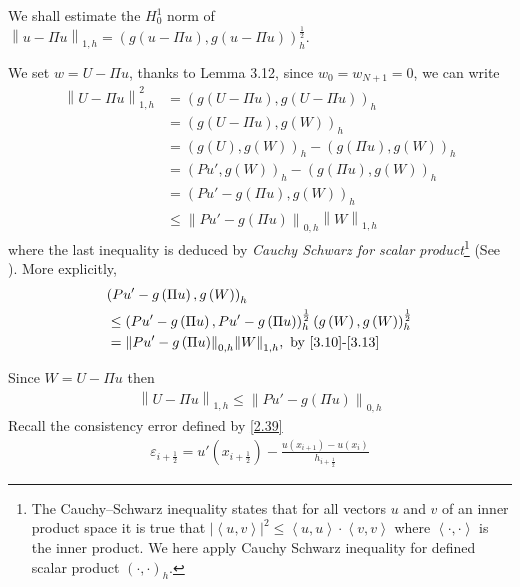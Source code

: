 \documentclass[a4paper]{article}
\numberwithin{equation}{section}
\begin{document}
We shall estimate the $H_0^1$ norm of ${\left\| {u - \Pi u} \right\|_{1,h}} = \left( {g\left( {u - \Pi u} \right),g\left( {u - \Pi u} \right)} \right)_h^{\frac{1}{2}}$.

We set $w = U - \Pi u$, thanks to Lemma 3.12, since $w_0=w_{N+1}=0$, we can write
\begin{align}
\left\| {U - \Pi u} \right\|_{1,h}^2 &= {\left( {g\left( {U - \Pi u} \right),g\left( {U - \Pi u} \right)} \right)_h}\\
 &= {\left( {g\left( {U - \Pi u} \right),g\left( W \right)} \right)_h}\\
 &= {\left( {g\left( U \right),g\left( W \right)} \right)_h} - {\left( {g\left( {\Pi u} \right),g\left( W \right)} \right)_h}\\
 &= {\left( {Pu',g\left( W \right)} \right)_h} - {\left( {g\left( {\Pi u} \right),g\left( W \right)} \right)_h}\\
 &= {\left( {Pu' - g\left( {\Pi u} \right),g\left( W \right)} \right)_h}\\
 &\le {\left\| {Pu' - g\left( {\Pi u} \right)} \right\|_{0,h}}{\left\| W \right\|_{1,h}}
\end{align}
where the last inequality is deduced by \textit{Cauchy Schwarz for scalar product}\footnote{The Cauchy–Schwarz inequality states that for all vectors $u$ and $v$ of an inner product space it is true that ${\left| {\left\langle {u,v} \right\rangle } \right|^2} \le \left\langle {u,u} \right\rangle  \cdot \left\langle {v,v} \right\rangle $ where $\left\langle { \cdot , \cdot } \right\rangle $ is the inner product. We here apply Cauchy Schwarz inequality for defined scalar product ${\left( { \cdot , \cdot } \right)_h}$.} (See \cite{3}). More explicitly,
\begin{align}
&{\left( {Pu' - g\left( {\Pi u} \right),g\left( W \right)} \right)_h}\\
& \le \left( {Pu' - g\left( {\Pi u} \right),Pu' - g\left( {\Pi u} \right)} \right)_h^{\frac{1}{2}}\left( {g\left( W \right),g\left( W \right)} \right)_h^{\frac{1}{2}}\\
& = {\left\| {Pu' - g\left( {\Pi u} \right)} \right\|_{0,h}}{\left\| W \right\|_{1,h}},\mbox{ by \eqref{3.10}-\eqref{3.13}}
\end{align}

Since $W = U - \Pi u$ then
\begin{align}
{\left\| {U - \Pi u} \right\|_{1,h}} \le {\left\| {Pu' - g\left( {\Pi u} \right)} \right\|_{0,h}}
\end{align}
Recall the consistency error defined by \eqref{2.39}
\begin{align}
{\varepsilon _{i + \frac{1}{2}}} = u'\left( {{x_{i + \frac{1}{2}}}} \right) - \frac{{u\left( {{x_{i + 1}}} \right) - u\left( {{x_i}} \right)}}{{{h_{i + \frac{1}{2}}}}}
\end{align}
\end{document}
